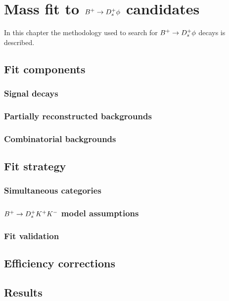 \chapter{Mass fit to ${{{B}^+}} \rightarrow {\ensuremath{{D}^+_{s}}} \phi$ candidates} 
\label{ch:B2DsPhi}

\minitoc

In this chapter the methodology used to search for ${{{B}^+}} \rightarrow {\ensuremath{{D}^+_{s}}} \phi$ decays is described.

\section{Fit components}
\subsection{Signal decays}
\subsection{Partially reconstructed backgrounds}
\subsection{Combinatorial  backgrounds}


\section{Fit strategy}
\subsection{Simultaneous categories}
\subsection{${{{B}^+}} \rightarrow {\ensuremath{{D}^+_{s}}} {\ensuremath{{K}^+}} {\ensuremath{{K}^-}}$ model assumptions }
\subsection{Fit validation}

\section{Efficiency corrections}

\section{Results}

